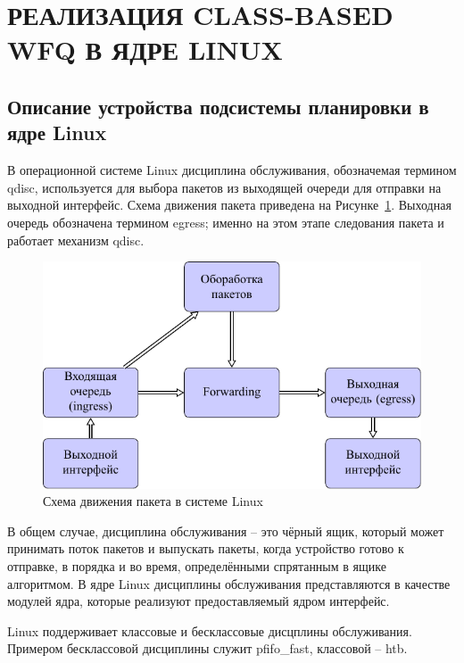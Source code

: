 \section{РЕАЛИЗАЦИЯ CLASS-BASED WFQ В ЯДРЕ LINUX}

	\subsection{Описание устройства подсистемы планировки в ядре Linux}

	В операционной системе Linux
	дисциплина обслуживания, обозначемая термином qdisc, используется
	для выбора пакетов из выходящей очереди для отправки на выходной интерфейс.
	Схема движения пакета приведена на Рисунке~\ref{pic:flow}. Выходная очередь
	обозначена термином egress; именно на этом этапе следования пакета
	и работает механизм qdisc.\cite{lartc}

    \begin{figure}[ht!]
        \center
        \includegraphics[scale=1.3]{pdfimages/qdisc.pdf}
        \caption{Схема движения пакета в системе Linux\cite{tcpip}}
		\label{pic:flow}
    \end{figure}

	В общем случае, дисциплина обслуживания -- это чёрный ящик, который может
	принимать поток пакетов и выпускать пакеты,
	когда устройство
	готово к отправке, в порядка и во время, определёнными спрятанным в ящике
	алгоритмом. В ядре Linux дисциплины обслуживания представляются в качестве
	модулей ядра, которые реализуют предоставляемый ядром интерфейс.

	Linux поддерживает классовые и бесклассовые дисцплины обслуживания. Примером
	бесклассовой дисциплины служит pfifo\_fast, классовой -- htb.\cite{lartc}

